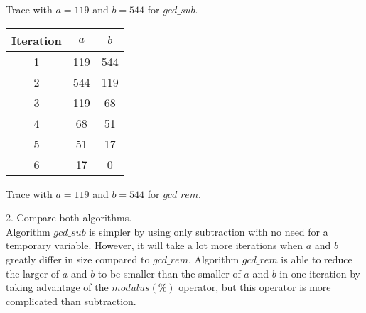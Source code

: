 \documentclass[12pt]{article}
\newenvironment{problem}[2][Problem]{\begin{trivlist}
\item[\hskip \labelsep {\bfseries #1}\hskip \labelsep {\bfseries #2.}]}{\end{trivlist}}
\begin{document}
\begin{problem}{1}
\begin{center}
    Trace with $a = 119$ and $b = 544$ for $gcd\_sub$.

    \begin{tabular}{|c c c|} 
        \hline
        Iteration & $a$ & $b$ \\
        \hline
        1 & 119 & 544 \\ 
        2 & 544 & 119 \\
        3 & 119 & 68 \\
        4 & 68 & 51 \\
        5 & 51 & 17 \\
        6 & 17 & 0 \\
        \hline
    \end{tabular}
    
    Trace with $a = 119$ and $b = 544$ for $gcd\_rem$.
\end{center}
2. Compare both algorithms.\\
Algorithm $gcd\_sub$ is simpler by using only subtraction with no need for a temporary variable. 
However, it will take a lot more iterations when $a$ and $b$ greatly differ in size compared to $gcd\_rem$.
Algorithm $gcd\_rem$ is able to reduce the larger of $a$ and $b$ to be smaller than the smaller of $a$ and $b$
in one iteration by taking advantage of the $modulus(\%)$ operator, but this operator is more complicated than subtraction.

\end{problem}
\end{document}
